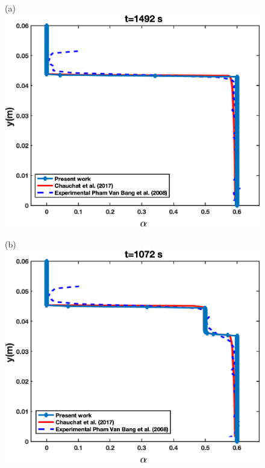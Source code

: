 \documentclass[review,3p,times,12pt]{elsarticle}
\begin{document}
\begin{minipage}[t]{0.5\textwidth}
\begin{figure}[H]
\begin{center}
(a)\includegraphics[scale = 0.45]{E4}
 \end{center}
\end{figure}
\end{minipage} \hfill 
\begin{minipage}[t]{0.5\textwidth}
\begin{figure}[H]
\begin{center}
(b)\includegraphics[scale = 0.45]{E3}
 \end{center}
\end{figure}
\end{minipage}\\
\end{document}
